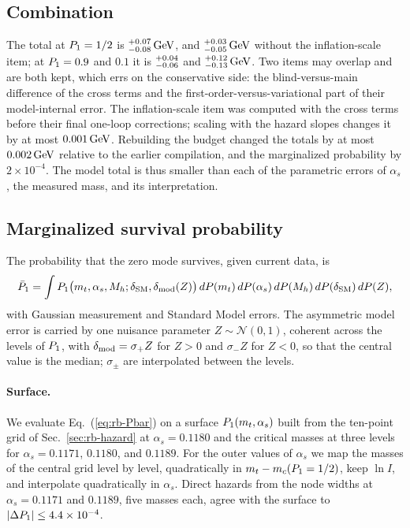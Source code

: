 \subsection{Combination}
\label{sec:rb-combination}

The total at $P_1=1/2$ is $^{+0.07}_{-0.08}\,\mathrm{GeV}$, and $^{+0.03}_{-0.05}\,\mathrm{GeV}$ without the inflation-scale item; at $P_1=0.9$ and $0.1$ it is $^{+0.04}_{-0.06}$ and $^{+0.12}_{-0.13}\,\mathrm{GeV}$. %
Two items may overlap and are both kept, which errs on the conservative side: the blind-versus-main difference of the cross terms and the first-order-versus-variational part of their model-internal error.
The inflation-scale item was computed with the cross terms before their final one-loop corrections; scaling with the hazard slopes changes it by at most $0.001\,\mathrm{GeV}$. %
Rebuilding the budget changed the totals by at most $0.002\,\mathrm{GeV}$ relative to the earlier compilation, and the marginalized probability by $2\times10^{-4}$. %
The model total is thus smaller than each of the parametric errors of $\alpha_s$, the measured mass, and its interpretation.

\subsection{Marginalized survival probability}
\label{sec:rb-pbar}

The probability that the zero mode survives, given current data, is
\begin{equation}
\bar P_1=\int P_1\bigl(m_t,\alpha_s,M_h;\delta_{\rm SM},\delta_{\rm mod}(Z)\bigr)\,dP(m_t)\,dP(\alpha_s)\,dP(M_h)\,dP(\delta_{\rm SM})\,dP(Z),
\label{eq:rb-Pbar}
\end{equation}
with Gaussian measurement and Standard Model errors.
The asymmetric model error is carried by one nuisance parameter $Z\sim\mathcal N(0,1)$, coherent across the levels of $P_1$, with $\delta_{\rm mod}=\sigma_+Z$ for $Z>0$ and $\sigma_-Z$ for $Z<0$, so that the central value is the median; $\sigma_\pm$ are interpolated between the levels.

\paragraph{Surface.}
We evaluate Eq.~(\ref{eq:rb-Pbar}) on a surface $P_1(m_t,\alpha_s)$ built from the ten-point grid of Sec.~\ref{sec:rb-hazard} at $\alpha_s=0.1180$ and the critical masses at three levels for $\alpha_s=0.1171$, $0.1180$, and $0.1189$. %
For the outer values of $\alpha_s$ we map the masses of the central grid level by level, quadratically in $m_t-m_c(P_1=1/2)$, keep $\ln I$, and interpolate quadratically in $\alpha_s$.
Direct hazards from the node widths at $\alpha_s=0.1171$ and $0.1189$, five masses each, agree with the surface to $|\Delta P_1|\le4.4\times10^{-4}$. %

